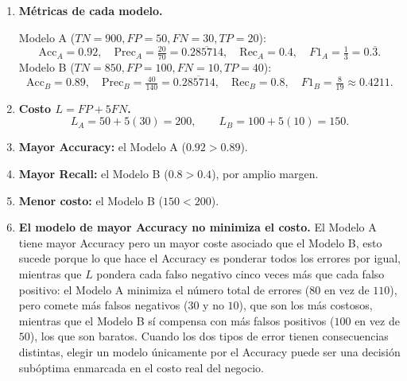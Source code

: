 \begin{enumerate}

\item \textbf{Métricas de cada modelo.}

Modelo A ($TN=900,FP=50,FN=30,TP=20$):
\[
    \text{Acc}_A = 0.92, \quad
    \text{Prec}_A = \tfrac{20}{70} = 0.\overline{285714}, \quad
    \text{Rec}_A = 0.4, \quad
    F1_A = \tfrac13 = 0.\overline{3}.
\]
Modelo B ($TN=850,FP=100,FN=10,TP=40$):
\[
    \text{Acc}_B = 0.89, \quad
    \text{Prec}_B = \tfrac{40}{140} = 0.\overline{285714}, \quad
    \text{Rec}_B = 0.8, \quad
    F1_B = \tfrac{8}{19} \approx 0.4211.
\]

\item \textbf{Costo $L=FP+5FN$.}
\[
    L_A = 50+5(30) = 200, \qquad L_B = 100+5(10) = 150.
\]

\item \textbf{Mayor Accuracy:} el Modelo A ($0.92 > 0.89$).

\item \textbf{Mayor Recall:} el Modelo B ($0.8 > 0.4$), por amplio margen.

\item \textbf{Menor costo:} el Modelo B ($150 < 200$).

\item \textbf{El modelo de mayor Accuracy no minimiza el costo.}
El Modelo A tiene mayor Accuracy pero un mayor coste asociado que el
Modelo B, esto sucede porque lo que hace el Accuracy es ponderar todos
los errores por igual, mientras que $L$ pondera cada falso negativo
cinco veces más que cada falso positivo: el Modelo A minimiza el
número total de errores ($80$ en vez de $110$), pero comete más falsos
negativos ($30$ y no $10$), que son los más costosos, mientras que el
Modelo B sí compensa con más falsos positivos ($100$ en vez de $50$),
los que son baratos. Cuando los dos tipos de error tienen consecuencias
distintas, elegir un modelo únicamente por el Accuracy puede ser una
decisión subóptima enmarcada en el costo real del negocio.

\end{enumerate}
